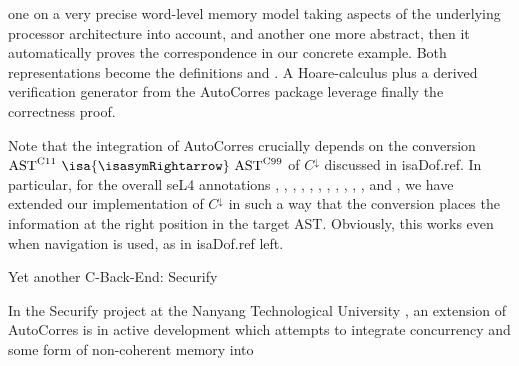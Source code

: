 \begin{isabellebody}
\begin{isamarkuptext}
one on a very precise word-level memory model taking aspects of the underlying processor
architecture into account, and another one more abstract, then it automatically proves the
correspondence in our concrete example. Both representations become the definitions
 and . A Hoare-calculus plus
a derived verification generator  from the AutoCorres package
leverage finally the correctness proof.%
\end{isamarkuptext}\isamarkuptrue%
%
\begin{isamarkuptext}%
Note that the integration of AutoCorres crucially depends on the conversion
$\text{AST}^\text{C11}~\isa{{\isasymRightarrow}}~\text{AST}^\text{C99}$ of $C^\downarrow$
discussed in \csname isaDof.ref. In particular, for the overall seL4
annotations
,
,
,
,
,
,
,
,
,
,
, and
,
we have extended our implementation of $C^\downarrow$ in such a way that the conversion places the
information at the right position in the target AST. Obviously, this works even when navigation is
used, as in \csname isaDof.ref left.%
\end{isamarkuptext}\isamarkuptrue%
%
\begin{isamarkupsubsection*}%
[label = {securify},type = {scholarly_paper.technical}, args={label = {securify},type = {scholarly_paper.technical}, scholarly_paper.text_section.main_author = {@{docitem ''fred''}}, Isa_COL.text_element.level = {}, Isa_COL.text_element.referentiable = {False}, Isa_COL.text_element.variants = {{STR ''outline'', STR ''document''}}, scholarly_paper.text_section.fixme_list = {}, Isa_COL.text_element.level = {}, scholarly_paper.technical.definition_list = {}}]Yet another C-Back-End: Securify%
\end{isamarkupsubsection*}\isamarkuptrue%
%
\begin{isamarkuptext}%
In the Securify project at the Nanyang Technological University \cite{DBLP:conf/tacas/SananZHZTL17,DBLP:conf/itp/HouSTL17}, an extension of AutoCorres is in
active development which attempts to integrate concurrency and some form of non-coherent memory into

\end{isamarkuptext}
\end{isabellebody}

